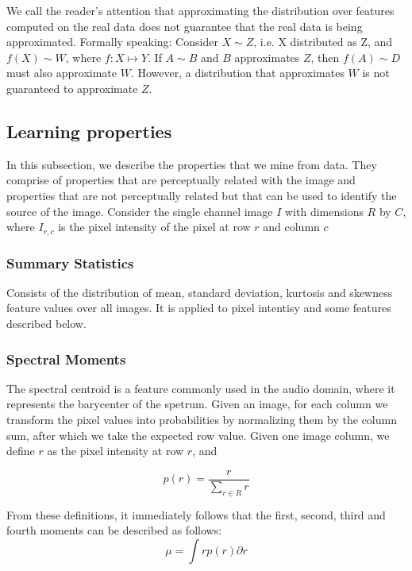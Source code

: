 We call the reader's attention that approximating the distribution over features
computed on the real data does not guarantee that the real data is being
approximated. Formally speaking:
Consider $X \sim Z$, i.e. X distributed as Z, and $f(X) \sim W$, where $f: X
\mapsto Y$.
If $A \sim B$ and $B$ approximates $Z$, then $f(A) \sim D$ must also approximate $W$.
However, a distribution that approximates $W$ is not guaranteed to approximate
$Z$.

\subsection{Learning properties}
In this subsection, we describe the properties that we mine from data. They
comprise of properties that are perceptually related with the image and
properties that are not perceptually related but that can be used to identify
the source of the image. Consider the single channel image $I$ with dimensions 
$R$ by $C$, where $I_{r, c}$ is the pixel intensity of the pixel at row $r$ and column $c$

\subsubsection{Summary Statistics}
Consists of the distribution of mean, standard
deviation, kurtosis and skewness feature values over all images. It is applied
to pixel intentisy and some features described below.

\subsubsection{Spectral Moments}
The spectral centroid is a feature commonly used in the audio domain, where it
represents the barycenter of the spetrum. Given an image, for each column we transform the
pixel values into probabilities by normalizing them by the column sum, after which we
take the expected row value. Given one image column, we define $r$ as the pixel
intensity at row $r$, and 

\begin{equation}
    p(r) = \frac{r}{\sum_{r \in R}r}
\end{equation}

From these definitions, it immediately follows that the first, second, third and fourth moments
can be described as follows: 
\begin{equation}
    \mu = \int rp(r) \partial r
\end{equation}

